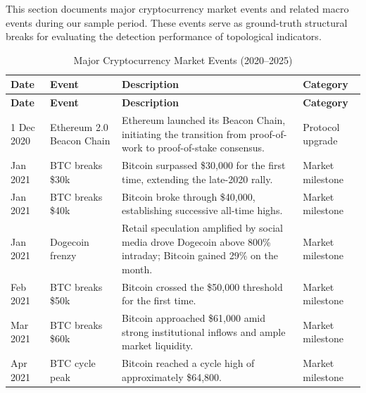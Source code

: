 \documentclass[11pt,reqno]{amsart}
\numberwithin{equation}{section} %
\begin{document}
\begin{appendices}
This section documents major cryptocurrency market events and related macro events during our sample period. These events serve as ground-truth structural breaks for evaluating the detection performance of topological indicators.
\begin{longtable}{
  >{\raggedright\arraybackslash}p{2.3cm}
  >{\raggedright\arraybackslash}p{3.1cm}
  >{\raggedright\arraybackslash}p{7.8cm}
  >{\raggedright\arraybackslash}p{3.2cm}}
\caption{Major Cryptocurrency Market Events (2020--2025)}
\label{tab:crypto-events}\\
\toprule
\textbf{Date} & \textbf{Event} & \textbf{Description} & \textbf{Category} \\
\midrule
\endfirsthead

\toprule
\textbf{Date} & \textbf{Event} & \textbf{Description} & \textbf{Category} \\
\midrule
\endhead

\midrule
\endfoot

\bottomrule
\endlastfoot

1 Dec 2020 & Ethereum 2.0 Beacon Chain &
Ethereum launched its Beacon Chain, initiating the transition from proof-of-work to proof-of-stake consensus. &
Protocol upgrade \\

2 Jan 2021 & BTC breaks \$30k &
Bitcoin surpassed \$30,000 for the first time, extending the late-2020 rally. &
Market milestone \\

7 Jan 2021 & BTC breaks \$40k &
Bitcoin broke through \$40,000, establishing successive all-time highs. &
Market milestone \\

29 Jan 2021 & Dogecoin frenzy &
Retail speculation amplified by social media drove Dogecoin above 800\% intraday; Bitcoin gained 29\% on the month. &
Market milestone \\

16 Feb 2021 & BTC breaks \$50k &
Bitcoin crossed the \$50,000 threshold for the first time. &
Market milestone \\

13 Mar 2021 & BTC breaks \$60k &
Bitcoin approached \$61,000 amid strong institutional inflows and ample market liquidity. &
Market milestone \\

10 Apr 2021 & BTC cycle peak &
Bitcoin reached a cycle high of approximately \$64,800. &
Market milestone \\


\end{longtable}
\end{appendices}
\end{document}
